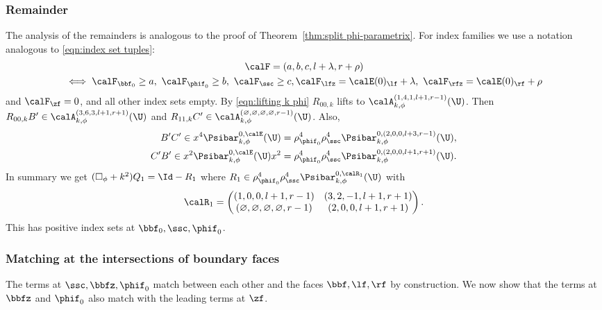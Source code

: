 \subsubsection*{Remainder}
The analysis of the remainders is analogous to the proof of Theorem~\ref{thm:split phi-parametrix}. For index families we use a notation analogous to \eqref{eqn:index set tuples}:
\begin{multline}
\label{eqn:index set tuples k phi}
\calF = (a,b,c,l+\lambda,r+\rho)\\
\iff
\calF_{\bbf_0}\geq a,\ \calF_{\phif_0}\geq b,\ \calF_\ssc\geq c,\calF_\lfz=\calE(0)_\lf+\lambda,\ \calF_\rfz=\calE(0)_\rf+\rho
\end{multline}
and $\calF_\zf=0$, and all other index sets empty.
By \eqref{eqn:lifting k phi} $R_{00,k}$ lifts to $\calA_{k,\phi}^{(1,4,1,l+1,r-1)}(\U)$.
Then $R_{00,k}B'\in\calA_{k,\phi}^{(3,6,3,l+1,r+1)}(\U)$ and $R_{11,k}C' \in \calA_{k,\phi}^{(\varnothing,\varnothing,\varnothing,\varnothing,r-1)}(\U)$. Also,
\begin{align*}
B'C'\in x^4\Psibar_{k,\phi}^{0,\calE}(\U)&=
\rho_{\phif_0}^4\rho_\ssc^4 \Psibar_{k,\phi}^{0,(2,0,0,l+3,r-1)}(\U), \\
C'B'\in x^2\Psibar_{k,\phi}^{0,\calE}(\U)x^2 &= \rho_{\phif_0}^4
\rho_\ssc^4\Psibar_{k,\phi}^{0,(2,0,0,l+1,r+1)}(\U).
\end{align*}
In summary we get
$(\square_\phi+k^2)Q_1=\Id - R_1$ where
$R_1\in\rho_{\phif_0}^4\rho_\ssc^4\Psibar_{k,\phi}^{0,\calR_1}(\U)$ with
\begin{equation}
\label{eqn:R1 k phi para}
\calR_1 =
\begin{pmatrix}
(1,0,0,l+1,r-1) & (3,2,-1,l+1,r+1) \\
(\varnothing,\varnothing,\varnothing,\varnothing,r-1) & (2,0,0,l+1,r+1)
\end{pmatrix}.
\end{equation}
This has positive index sets at $\bbf_0,\ssc,\phif_0$.

\subsubsection*{Matching at the intersections of boundary faces}
The terms at $\ssc,\bbfz, \phif_0$ match \hbox{between} each other and the faces $\bbf, \lf, \rf$ by construction.
We now show that the terms at $\bbfz$ and $\phif_0$ also match with the leading terms at $\zf$.

